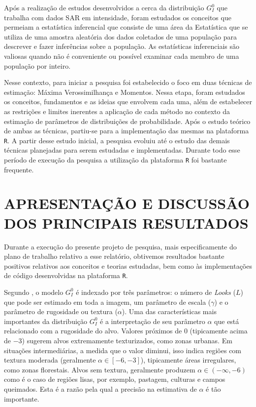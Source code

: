 \documentclass[12pt]{article}
\begin{document}
Após a realização de estudos desenvolvidos a cerca da distribuição $G_I^0$ que trabalha com dados SAR em intensidade, foram estudados os conceitos que permeiam a estatística inferencial que consiste de uma área da Estatística que se utiliza de uma amostra aleatória dos dados coletados de uma população para descrever e fazer inferências sobre a população. As estatísticas inferenciais são valiosas quando não é conveniente ou possível examinar cada membro de uma população por inteiro.

Nesse contexto, para iniciar a pesquisa foi estabelecido o foco em duas técnicas de estimação: Máxima Verossimilhança e Momentos. Nessa etapa, foram estudados os conceitos, fundamentos e as ideias que envolvem cada uma, além de estabelecer as restrições e limites inerentes a aplicação de cada método no contexto da estimação de parâmetros de distribuições de probabilidade. Após o estudo teórico de ambas as técnicas, partiu-se para a implementação das mesmas na plataforma \texttt{R}. A partir desse estudo inicial, a pesquisa evoluiu até o estudo das demais técnicas planejadas para serem estudadas e implementadas. Durante todo esse período de execução da pesquisa a utilização da plataforma \texttt{R} foi bastante frequente.



\newpage
\section*{\centering \textbf{APRESENTAÇÃO E DISCUSSÃO DOS PRINCIPAIS RESULTADOS}}
\vspace{0.5cm}

Durante a execução do presente projeto de pesquisa, mais especificamente do plano de trabalho relativo a esse relatório, obtivemos resultados bastante positivos relativos aos conceitos e teorias estudadas, bem como às implementações de código desenvolvidas na plataforma \texttt{R}. 

Segundo \citet{FreryStochasticDistances2015}, o modelo $G_I^0$ é indexado por três parâmetros: o número de \textit{Looks} ($L$) que pode ser estimado em toda a imagem, um parâmetro de escala ($\gamma$) e o parâmetro de rugosidade ou textura ($\alpha$). Uma das características mais importantes da distribuição $G_I^0$ é a interpretação de seu parâmetro $\alpha$ que está relacionado com a rugosidade do alvo. Valores próximos de $0$ (tipicamente acima de $-3$) sugerem alvos extremamente texturizados, como zonas urbanas. Em situações intermediárias, a medida que o valor diminui, isso indica regiões com textura moderada (geralmente $\alpha \in  [−6, −3]$), tipicamente áreas irregulares, como zonas florestais. Alvos sem textura, geralmente produzem $\alpha \in (−\infty, −6)$ como é o caso de regiões lisas, por exemplo, pastagem, culturas e campos queimados. Esta é a razão pela qual a precisão na estimativa de $\alpha$ é tão importante.
\end{document}

